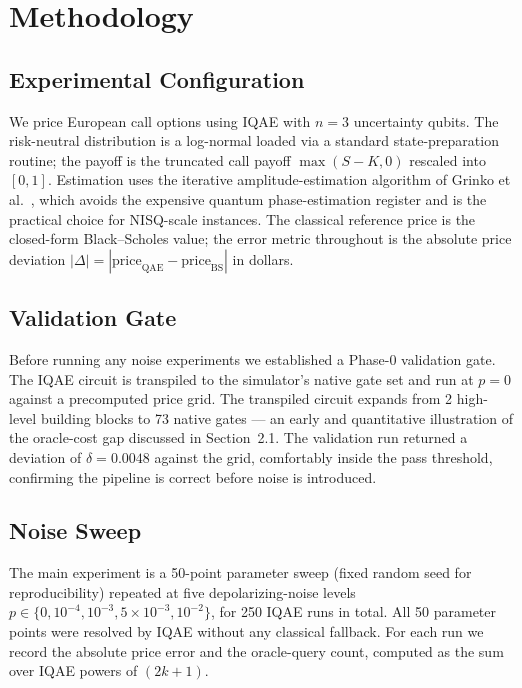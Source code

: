 \documentclass[runningheads]{llncs}
\begin{document}
\section{Methodology}
\subsection{Experimental Configuration}
We price European call options using IQAE with $n = 3$ uncertainty qubits. The
risk-neutral distribution is a log-normal loaded via a standard
state-preparation routine; the payoff is the truncated call payoff
$\max(S - K, 0)$ rescaled into $[0, 1]$. Estimation uses the iterative
amplitude-estimation algorithm of Grinko et al.~\cite{grinko2021}, which avoids
the expensive quantum phase-estimation register and is the practical choice for
NISQ-scale instances. The classical reference price is the closed-form
Black--Scholes value; the error metric throughout is the absolute price
deviation $|\Delta| = |\text{price}_{\text{QAE}} - \text{price}_{\text{BS}}|$ in
dollars.

\subsection{Validation Gate}
Before running any noise experiments we established a Phase-0 validation gate.
The IQAE circuit is transpiled to the simulator's native gate set and run at
$p = 0$ against a precomputed price grid. The transpiled circuit expands from 2
high-level building blocks to 73 native gates --- an early and quantitative
illustration of the oracle-cost gap discussed in Section~2.1. The validation run
returned a deviation of $\delta = 0.0048$ against the grid, comfortably inside
the pass threshold, confirming the pipeline is correct before noise is
introduced.

\subsection{Noise Sweep}
The main experiment is a 50-point parameter sweep (fixed random seed for
reproducibility) repeated at five depolarizing-noise levels
$p \in \{0, 10^{-4}, 10^{-3}, 5\times10^{-3}, 10^{-2}\}$, for 250 IQAE runs in
total. All 50 parameter points were resolved by IQAE without any classical
fallback. For each run we record the absolute price error and the oracle-query
count, computed as the sum over IQAE powers of $(2k + 1)$.
\end{document}
